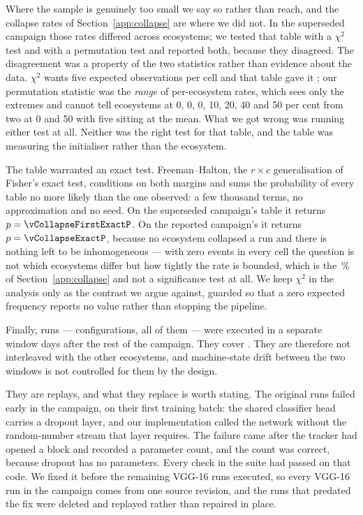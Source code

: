 Where the sample is genuinely too small we say so rather than reach, and the
collapse rates of Section~\ref{app:collapse} are where we did not. In the
superseded campaign those rates differed across ecosystems; we tested that table with
a $\chi^2$ test and with a permutation test and reported both, because they
disagreed. The disagreement was a property of the two statistics rather than
evidence about the data. $\chi^2$ wants five expected observations per cell and
that table gave it \vCollapseFirstChiSqMinExpected; our permutation statistic
was the \emph{range} of per-ecosystem rates, which sees only the extremes and
cannot tell \vEcosystems{} ecosystems at 0, 0, 0, 10, 20, 40 and 50 per cent from two at
0 and 50 with five sitting at the mean. What we got wrong was running either
test at all. Neither was the right test for that table, and the table was
measuring the initialiser rather than the ecosystem.

The table warranted an exact test. Freeman--Halton, the $r \times c$
generalisation of Fisher's exact test, conditions on both margins and sums the
probability of every table no more likely than the one observed: a few thousand
terms, no approximation and no seed. On the superseded campaign's table it
returns $p = \vCollapseFirstExactP$. On the reported campaign's it returns
$p = \vCollapseExactP$, because no ecosystem collapsed a run and there is
nothing left to be inhomogeneous --- with zero events in every cell the question
is not which ecosystems differ but how tightly the rate is bounded, which is the
\vCollapseRateUpperNinetyFive\,\% of Section~\ref{app:collapse} and not a
significance test at all. We keep $\chi^2$ in the analysis only as the contrast
we argue against, guarded so that a zero expected frequency reports no value
rather than stopping the pipeline.

Finally, \vLateRuns{} runs --- \vLateConfigurations{} configurations, all of
them \vLateEcosystems{} --- were executed in a separate window \vLateGapDays{}
days after the rest of the campaign. They cover \vLateBlocks{}. They are therefore
not interleaved with the other ecosystems, and machine-state drift between the
two windows is not controlled for them by the design.

They are replays, and what they replace is worth stating. The original runs
failed early in the campaign, on their first training batch: the shared
classifier head carries a dropout layer, and our \vLateEcosystems{}
implementation called the network without the random-number stream that layer
requires. The failure came after the tracker had opened a block and recorded a
parameter count, and the count was correct, because dropout has no parameters.
Every check in the suite had passed on that code. We fixed it before the
remaining \vLateEcosystems{} VGG-16 runs executed, so every \vLateEcosystems{}
VGG-16 run in the campaign comes from one source revision, and the runs that
predated the fix were deleted and replayed rather than repaired in place.

